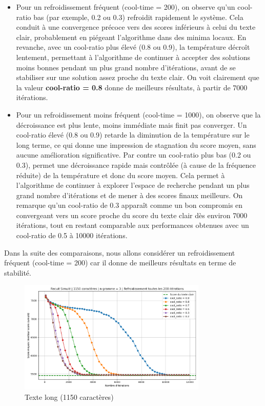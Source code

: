\documentclass[a4paper]{article}
\begin{document}
\begin{itemize}
    \item Pour un refroidissement fréquent (cool-time = 200), on observe qu'un cool-ratio bas (par exemple, 0.2 ou 0.3) refroidit rapidement le système. Cela conduit à une convergence précoce vers des scores inférieurs à celui du texte clair, probablement en piégeant l'algorithme dans des minima locaux. 
          En revanche, avec un cool-ratio plus élevé (0.8 ou 0.9), la température décroît lentement, permettant à l’algorithme de continuer à accepter des solutions moins bonnes pendant un plus grand nombre d’itérations, avant de se stabiliser sur une solution assez proche du texte clair. 
          On voit clairement que la valeur \textbf{cool-ratio = 0.8} donne de meilleurs résultats, à partir de 7000 itérations.
    \item Pour un refroidissement moins fréquent (cool-time = 1000), on observe que la décroissance est plus lente, moins immédiate mais finit pas converger. Un cool-ratio élevé (0.8 ou 0.9) retarde la diminution de la température sur le long terme, ce qui donne une impression de stagnation du score moyen, sans aucune amélioration significative.
          Par contre un cool-ratio plus bas (0.2 ou 0.3), permet une décroissance rapide mais contrôlée (à cause de la fréquence réduite) de la température et donc du score moyen. Cela permet à l'algorithme de continuer à explorer l'espace de recherche pendant un plus grand nombre d'itérations et de mener à des scores finaux meilleurs. 
          On remarque qu'un cool-ratio de 0.3 apparaît comme un bon compromis en convergeant vers un score proche du score du texte clair dès environ 7000 itérations, tout en restant comparable aux performances obtenues avec un cool-ratio de 0.5 à 10000 itérations.
\end{itemize}

Dans la suite des comparaisons, nous allons considérer un refroidissement fréquent (cool-time = 200) car il donne de meilleurs résultats en terme de stabilité.

\begin{figure}[H]
    \centering
    \includegraphics[width=0.8\textwidth, keepaspectratio, height=0.7\textheight]{graphe_recuit_n_3_1150_cool_time_200.png}
    \caption{Texte long (1150 caractères)}
    \label{fig:n3-110-1000}
\end{figure}
\end{document}
